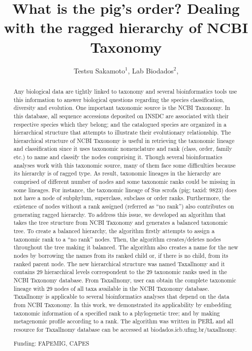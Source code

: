 \documentclass[twoside]{article}
\title{\vspace{-15mm}\fontsize{24pt}{10pt}\selectfont\textbf{ What is the pig’s order? Dealing with the ragged hierarchy of NCBI Taxonomy }} %
\author{ Testsu Sakamoto$^{1}$, Lab Biodados$^{2}$, }
\affil{ 1 Universidade Federal de Minas Gerais. Laboratório de Biodados.

2 Universidade Federal de Minas Gerais

 }
\date{}
\begin{document}
  
  
  \maketitle %
  
  
  \thispagestyle{fancy} %
  
  
  \begin{abstract}
  Any biological data are tightly linked to taxonomy and several bioinformatics tools use this information to answer biological questions regarding the species classification, diversity and evolution. One important taxonomic source is the NCBI Taxonomy. In this database, all sequence accessions deposited on INSDC are associated with their respective species which they belong; and the catalogued species are organized in a hierarchical structure that attempts to illustrate their evolutionary relationship. The hierarchical structure of NCBI Taxonomy is useful in retrieving the taxonomic lineage and classification since it uses taxonomic nomenclature and rank (class, order, family etc.) to name and classify the nodes comprising it. Though several bioinformatics analyses work with this taxonomic source, many of them face some difficulties because its hierarchy is of ragged type. As result, taxonomic lineages in the hierarchy are comprised of different number of nodes and some taxonomic ranks could be missing in some lineages. For instance, the taxonomic lineage of Sus scrofa (pig; taxid: 9823) does not have a node of subphylum, superclass, subclass or order ranks. Furthermore, the existence of nodes without a rank assigned (referred as “no rank”) also contributes on generating ragged hierarchy. To address this issue, we developed an algorithm that takes the tree structure from NCBI Taxonomy and generates a balanced taxonomic tree. To create a balanced hierarchy, the algorithm firstly attempts to assign a taxonomic rank to a “no rank” nodes. Then, the algorithm creates/deletes nodes throughout the tree making it balanced. The algorithm also creates a name for the new nodes by borrowing the names from its ranked child or, if there is no child, from its ranked parent node. The new hierarchical structure was named Taxallnomy and it contains 29 hierarchical levels correspondent to the 29 taxonomic ranks used in the NCBI Taxonomy database. From Taxallnomy, user can obtain the complete taxonomic lineage with 29 nodes of all taxa available in the NCBI Taxonomy database. Taxallnomy is applicable to several bioinformatics analyses that depend on the data from NCBI Taxonomy. In this work, we demonstrated its applicability by embedding taxonomic information of a specified rank to a phylogenetic tree; and by making metagenomic profile according to a rank. The algorithm was written in PERL and all resource for Taxallnomy database can be accessed at biodados.icb.ufmg.br/taxallnomy.
  
  Funding: FAPEMIG, CAPES \\ 
  \end{abstract}
  
\end{document}
